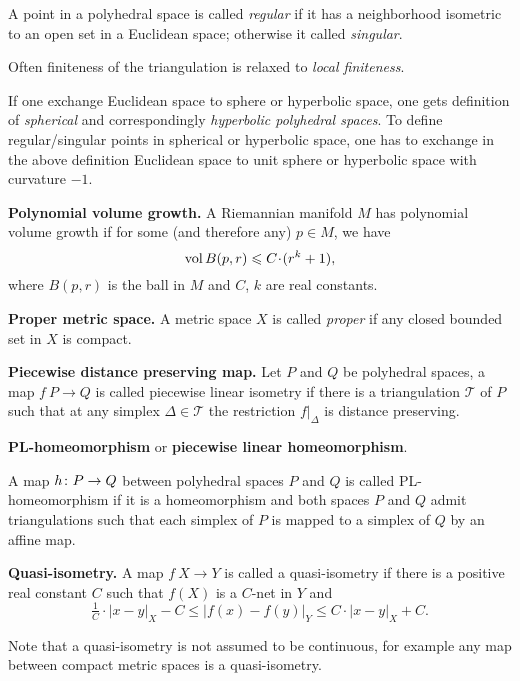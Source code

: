 \begin{description}
A point in a polyhedral space is called \emph{regular} if it has a neighborhood isometric to an open set in a Euclidean space;
otherwise it called \emph{singular}.

Often finiteness of the triangulation is relaxed to \emph{local finiteness}.

If one exchange Euclidean space to sphere or hyperbolic space,
one gets definition of \emph{spherical} and correspondingly \emph{hyperbolic polyhedral spaces}.
To define regular/singular points in spherical or hyperbolic space,
one has to exchange in the above definition Euclidean space to unit sphere or hyperbolic space with curvature $-1$.


\item{\bf Polynomial volume growth.}\label{Polynomial volume growth} A Riemannian manifold $M$ has polynomial volume growth if for some (and therefore any) $p\in M$, 
we have 
$$\vol B(p,r)\z\le C\cdot (r^k+1),$$ 
where $B(p,r)$ is the ball in $M$ and  $C$, $k$ are real constants.

\item{\bf Proper metric space.}
\label{Proper metric space} 
A metric space $X$ is called \emph{proper} if any closed bounded set in $X$ is compact.

\item{\bf Piecewise distance preserving map.}%
%
\label{Piecewise distance preserving map} 
Let $P$ and $Q$ be polyhedral spaces, a map $f\:P\to Q$ is called piecewise linear isometry if there is a triangulation $\mathcal{T}$ of $P$ such that at any simplex $\Delta\in \mathcal{T}$ the restriction $f|_\Delta$ is distance preserving.

\item{\bf  PL-homeomorphism}\label{PL-homeomorphism} or {\bf piecewise linear homeomorphism}.

A map $h\:P\z\to Q$ between polyhedral spaces $P$ and $Q$ is called PL-homeomorphism if it is a homeomorphism and both spaces $P$ and $Q$ admit triangulations such that each simplex of $P$ is mapped to a simplex of $Q$ by an affine map.

\item{\bf  Quasi-isometry.}\label{Quasi-isometry} A map $f\:X\to Y$ is called a quasi-isometry if there is a positive real constant $C$ such that $f(X)$ is a $C$-net in $Y$ and
$$\tfrac{1}{C}\cdot|x-y|_X-C
\le 
|f(x)-f(y)|_Y\le C\cdot|x-y|_X+C.$$

Note that a quasi-isometry is not assumed to be continuous, for example any map between compact metric spaces is a quasi-isometry.


\end{description}
